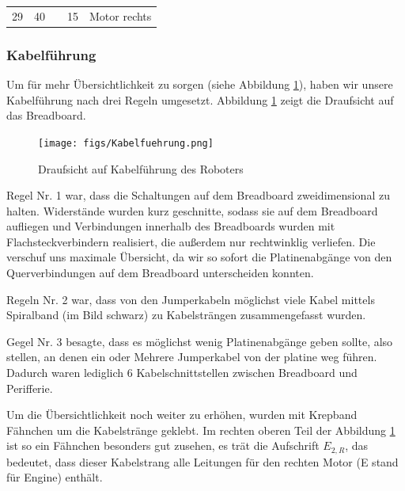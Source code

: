 \documentclass[12pt,a4paper,oneside]{article}
\begin{document}
\begin{spacing}{1.15}
\begin{table}[h]
\begin{tabular}{lllll}
		\rowcolor[HTML]{C0C0C0} 
		29                                                                                                                      & 40                                                                                                                 &                                                        & 15                                                                                                                 & \multirow{-3}{*}{\cellcolor[HTML]{C0C0C0}Motor rechts}                                                    
	\end{tabular}
\end{table}

\subsubsection{Kabelführung}
Um für mehr Übersichtlichkeit zu sorgen (siehe Abbildung \ref{fig:Kabelfuehrung}), haben wir unsere Kabelführung nach drei Regeln umgesetzt. Abbildung \ref{fig:Kabelfuehrung} zeigt die Draufsicht auf das Breadboard.
\begin{center}
	\begin{figure}[!htb]
		\centering
		\texttt{[image: figs/Kabelfuehrung.png]}
		\caption{Draufsicht auf Kabelführung des Roboters}
		\label{fig:Kabelfuehrung}
	\end{figure}
\end{center}


Regel Nr. 1 war, dass die Schaltungen auf dem Breadboard zweidimensional zu halten. Widerstände wurden kurz geschnitte, sodass sie auf dem Breadboard aufliegen und Verbindungen innerhalb des Breadboards wurden mit Flachsteckverbindern realisiert, die außerdem nur rechtwinklig verliefen. Die verschuf uns maximale Übersicht, da wir so sofort die Platinenabgänge von den Querverbindungen auf dem Breadboard unterscheiden konnten.


Regeln Nr. 2 war, dass von den Jumperkabeln möglichst viele Kabel mittels Spiralband (im Bild schwarz) zu Kabelsträngen zusammengefasst wurden. 

Gegel Nr. 3 besagte, dass es möglichst wenig Platinenabgänge geben sollte, also stellen, an denen ein oder Mehrere Jumperkabel von der platine weg führen. Dadurch waren lediglich 6 Kabelschnittstellen zwischen Breadboard und Perifferie.

Um die Übersichtlichkeit noch weiter zu erhöhen, wurden mit Krepband Fähnchen um die Kabelstränge geklebt. Im rechten oberen Teil der Abbildung \ref{fig:Kabelfuehrung} ist so ein Fähnchen besonders gut zusehen, es trät die Aufschrift \textit{$E_{2,R}$}, das bedeutet, dass dieser Kabelstrang alle Leitungen für den rechten Motor (E stand für Engine) enthält.      



\end{spacing}
\end{document}
